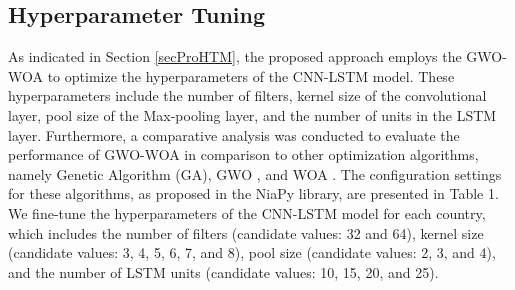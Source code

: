 \documentclass{article}
\begin{document}
\subsection{Hyperparameter Tuning}
As indicated in Section  \ref{secProHTM}, the proposed approach employs the GWO-WOA to optimize the hyperparameters of the CNN-LSTM model. These hyperparameters include the number of filters, kernel size of the convolutional layer, pool size of the Max-pooling layer, and the number of units in the LSTM layer. Furthermore, a comparative analysis was conducted to evaluate the performance of GWO-WOA in comparison to other optimization algorithms, namely Genetic Algorithm (GA), GWO \cite{mirjalili2014grey}, and WOA \cite{mirjalili2016whale}. The configuration settings for these algorithms, as proposed in the NiaPy library, are presented in Table 1.\\
We fine-tune the hyperparameters of the CNN-LSTM model for each country, which includes the number of filters (candidate values: 32 and 64), kernel size (candidate values: 3, 4, 5, 6, 7, and 8), pool size (candidate values: 2, 3, and 4), and the number of LSTM units (candidate values: 10, 15, 20, and 25).\\
\end{document}
